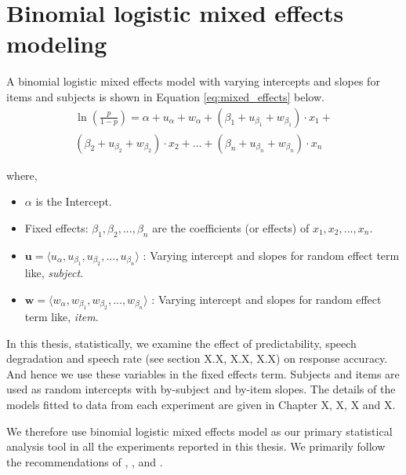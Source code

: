 \documentclass[a4paper, nobind]{templates/ociamthesis}
\providecommand{\tightlist}{%
  \setlength{\itemsep}{0pt}\setlength{\parskip}{0pt}}
\begin{document}
\hypertarget{binomial-logistic-mixed-effects-model}{%
\section{Binomial logistic mixed effects modeling}\label{binomial-logistic-mixed-effects-model}}

A binomial logistic mixed effects model with varying intercepts and slopes for items and subjects is shown in Equation \ref{eq:mixed_effects} below.
\begin{align} \label{eq:mixed_effects}
\ln (\frac{p}{1-p}) = \alpha + u_{\alpha} + w_{\alpha} +
                      (\beta_{1} + u_{\beta_{1}} + w_{\beta_{1}})\cdot {x_1} + \nonumber\\
                      (\beta_{2} + u_{\beta_{2}} + w_{\beta_{2}})\cdot {x_2} + ... +
                      (\beta_{n} + u_{\beta_{n}} + w_{\beta_{n}})\cdot {x_n} 
\end{align}

where,

\begin{itemize}
\tightlist
\item
  \(\alpha\) is the Intercept.
\item
  Fixed effects: \(\beta_{1}, \beta_{2}, ..., \beta_{n}\) are the coefficients (or effects) of \(x_1, x_2, ...,x_n\).
\item
  \(\boldsymbol{u} = \langle u_{\alpha}, u_{\beta_1}, u_{\beta_2}, ..., u_{\beta_n} \rangle\) : Varying intercept and slopes for random effect term like, \emph{subject}.
\item
  \(\boldsymbol{w} = \langle w_{\alpha}, w_{\beta_1}, w_{\beta_2}, ..., w_{\beta_n} \rangle\) : Varying intercept and slopes for random effect term like, \emph{item}.
\end{itemize}

In this thesis, statistically, we examine the effect of predictability, speech degradation and speech rate (see section X.X, X.X, X.X) on response accuracy.
And hence we use these variables in the fixed effects term.
Subjects and items are used as random intercepts with by-subject and by-item slopes.
The details of the models fitted to data from each experiment are given in Chapter X, X, X and X.

We therefore use binomial logistic mixed effects model as our primary statistical analysis tool in all the experiments reported in this thesis. We primarily follow the recommendations of \textcite{Baayen2008}, \textcite{Barr2013}, and \textcite{Bates2015a}.
\end{document}
